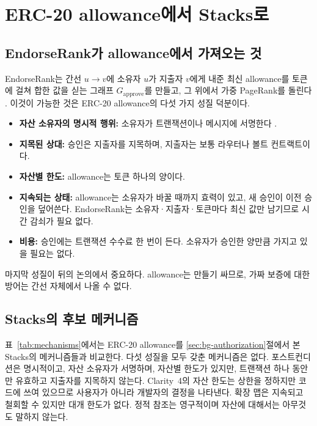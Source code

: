 \section{ERC-20 allowance에서 Stacks로}
\label{sec:mapping}

\subsection{EndorseRank가 allowance에서 가져오는 것}

EndorseRank는 간선 $u\to v$에 소유자 $u$가 지출자 $v$에게 내준 최신 allowance를 토큰에 걸쳐 합한 값을 싣는 그래프 $G_{\mathrm{approve}}$를 만들고, 그 위에서 가중 PageRank를 돌린다 \cite{kwon2026endorserank}. 이것이 가능한 것은 ERC-20 allowance의 다섯 가지 성질 덕분이다.

\begin{itemize}
\item \textbf{자산 소유자의 명시적 행위:} 소유자가  트랜잭션이나  메시지에 서명한다 \cite{eip20,eip2612}.
\item \textbf{지목된 상대:} 승인은 지출자를 지목하며, 지출자는 보통 라우터나 볼트 컨트랙트이다.
\item \textbf{자산별 한도:} allowance는 토큰 하나의 양이다.
\item \textbf{지속되는 상태:} allowance는 소유자가 바꿀 때까지 효력이 있고, 새 승인이 이전 승인을 덮어쓴다. EndorseRank는 소유자·지출자·토큰마다 최신 값만 남기므로 시간 감쇠가 필요 없다.
\item \textbf{비용:} 승인에는 트랜잭션 수수료 한 번이 든다. 소유자가 승인한 양만큼 가지고 있을 필요는 없다.
\end{itemize}

마지막 성질이 뒤의 논의에서 중요하다. allowance는 만들기 싸므로, 가짜 보증에 대한 방어는 간선 자체에서 나올 수 없다.

\subsection{Stacks의 후보 메커니즘}

표~\ref{tab:mechanisms}에서는 ERC-20 allowance를 \ref{sec:bg-authorization}절에서 본 Stacks의 메커니즘들과 비교한다. 다섯 성질을 모두 갖춘 메커니즘은 없다. 포스트컨디션은 명시적이고, 자산 소유자가 서명하며, 자산별 한도가 있지만, 트랜잭션 하나 동안만 유효하고 지출자를 지목하지 않는다. Clarity~4의 자산 한도는 상한을 정하지만 코드에 쓰여 있으므로 사용자가 아니라 개발자의 결정을 나타낸다. 확장 맵은 지속되고 철회할 수 있지만 대개 한도가 없다. 정적 참조는 영구적이며 자산에 대해서는 아무것도 말하지 않는다.

